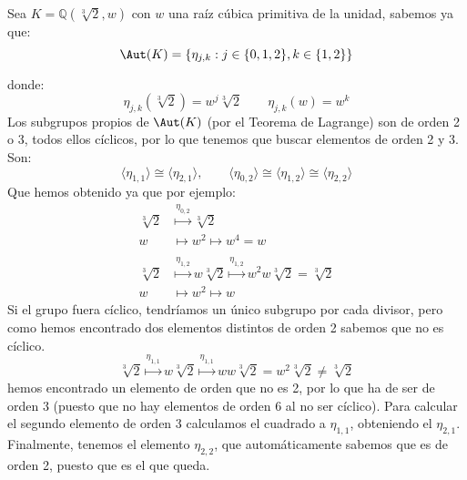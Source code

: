 \begin{ejemplo}
    Sea $K = \mathbb{Q}\left(\sqrt[3]{2},w\right)$ con $w$ una raíz cúbica primitiva de la unidad, sabemos ya que:
    \begin{equation*}
        \Aut(K) = \{\eta_{j,k} : j\in \{0,1,2\}, k \in \{1,2\}\}
    \end{equation*}

    donde:
    \begin{equation*}
        \eta_{j,k}(\sqrt[3]{2}) = w^j \sqrt[3]{2} \qquad \eta_{j,k}(w) = w^k
    \end{equation*}
    Los subgrupos propios de $\Aut(K)$ (por el Teorema de Lagrange) son de orden 2 o 3, todos ellos cíclicos, por lo que tenemos que buscar elementos de orden 2 y 3. Son:
    \begin{equation*}
        \langle \eta_{1,1} \rangle  \cong \langle \eta_{2,1} \rangle, \qquad \langle \eta_{0,2} \rangle  \cong \langle \eta_{1,2} \rangle  \cong \langle \eta_{2,2} \rangle 
    \end{equation*}
    Que hemos obtenido ya que por ejemplo:
    \begin{align*}
        \sqrt[3]{2} &\stackrel{\eta_{0,2}}{\longmapsto} \sqrt[3]{2} \\
        w &\longmapsto w^2 \longmapsto w^4 = w \\
        \\
        \sqrt[3]{2} &\stackrel{\eta_{1,2}}{\longmapsto} w\sqrt[3]{2} \stackrel{\eta_{1,2}}{\longmapsto} w^2 w\sqrt[3]{2} = \sqrt[3]{2} \\
        w &\longmapsto w^2 \longmapsto w 
    \end{align*}
    Si el grupo fuera cíclico, tendríamos un único subgrupo por cada divisor, pero como hemos encontrado dos elementos distintos de orden 2 sabemos que no es cíclico.
    \begin{equation*}
        \sqrt[3]{2} \stackrel{\eta_{1,1}}{\longmapsto} w\sqrt[3]{2} \stackrel{\eta_{1,1}}{\longmapsto} ww\sqrt[3]{2} = w^2\sqrt[3]{2} \neq \sqrt[3]{2}
    \end{equation*}
    hemos encontrado un elemento de orden que no es 2, por lo que ha de ser de orden 3 (puesto que no hay elementos de orden 6 al no ser cíclico). Para calcular el segundo elemento de orden 3 calculamos el cuadrado a $\eta_{1,1}$, obteniendo el $\eta_{2,1}$. Finalmente, tenemos el elemento $\eta_{2,2}$, que automáticamente sabemos que es de orden 2, puesto que es el que queda.\\


\end{ejemplo}
